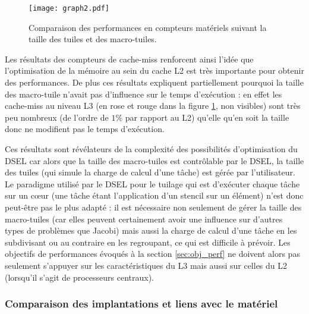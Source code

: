 \begin{figure}[!h]
  \caption{Comparaison des performances en compteurs matériels suivant la taille des tuiles et des macro-tuiles.}
  \label{graph:comp_tuile_cmiss}
  \texttt{[image: graph2.pdf]}
\end{figure}

Les résultats des compteurs de cache-miss renforcent ainsi l'idée que l'optimisation de la mémoire au sein du cache L2 est très importante pour obtenir des performances. De plus ces résultats expliquent partiellement pourquoi la taille des macro-tuile n'avait pas d'influence sur le temps d'exécution : en effet les cache-miss au niveau L3 (en rose et rouge dans la figure \ref{graph:comp_tuile_cmiss}, non visibles) sont très peu nombreux (de l'ordre de $1\%$ par rapport au L2) qu'elle qu'en soit la taille donc ne modifient pas le temps d'exécution.

Ces résultats sont révélateurs de la complexité des possibilités d'optimisation du DSEL car alors que la taille des macro-tuiles est contrôlable par le DSEL, la taille des tuiles (qui simule la charge de calcul d'une tâche) est gérée par l'utilisateur. Le paradigme utilisé par le DSEL pour le tuilage qui est d'exécuter chaque tâche sur un cœur (une tâche étant l'application d'un stencil sur un élément) n'est donc peut-être pas le plus adapté : il est nécessaire non seulement de gérer la taille des macro-tuiles (car elles peuvent certainement avoir une influence sur d'autres types de problèmes que Jacobi) mais aussi la charge de calcul d'une tâche en les subdivisant ou au contraire en les regroupant, ce qui est difficile à prévoir. Les objectifs de performances évoqués à la section \ref{sec:obj_perf} ne doivent alors pas seulement s'appuyer sur les caractéristiques du L3 mais aussi sur celles du L2 (lorsqu'il s'agit de processeurs centraux).


\subsubsection*{Comparaison des implantations et liens avec le matériel}


